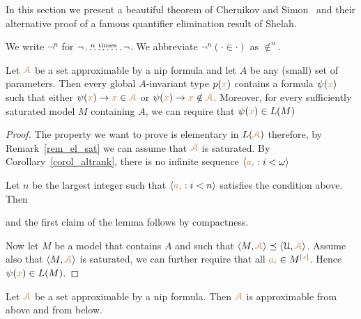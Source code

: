 \documentclass[creche.tex]{subfiles}
\begin{document}
In this section we present a beautiful theorem of Chernikov and Simon~\cite{CS} and their alternative proof of a famous quantifier elimination result of Shelah. 

We write \emph{$\neg^n$\/} for $\neg\!\stackrel{n\ \rm times}{\dots\dots\dots}\!\neg$. We abbreviate $\neg^n(\cdot\in\cdot)$ as \emph{$\notin^n$}.

\begin{lemma}\label{lem_honest}
Let ${\color{brown}{\EuScript A}}$ be a set approximable by a nip formula and let $A$ be any (small) set of parameters. Then every global $A$-invariant type $p({\color{brown} x})$ contains a formula $\psi({\color{brown} x})$ such that either $\psi({\color{brown} x})\rightarrow {\color{brown}x}\in{\color{brown}{\EuScript A}}$ or $\psi({\color{brown} x})\rightarrow {\color{brown}x}\notin{\color{brown}{\EuScript A}}$. Moreover, for every sufficiently saturated model $M$ containing $A$, we can require that $\psi({\color{brown} x})\in L(M)$
\end{lemma}

\begin{proof}
The property we want to prove is elementary in $L({\color{brown}{\EuScript A}})$ therefore, by Remark~\ref{rem_el_sat} we can assume that ${\color{brown}{\EuScript A}}$ is saturated. By Corollary~\ref{corol_altrank}, there is no infinite sequence $\langle{\color{brown}a_i}:i<\omega\rangle$


Let $n$ be the largest integer such that $\langle{\color{brown}a_i}:i<n\rangle$ satisfies the condition above. Then


and the first claim of the lemma follows by compactness. 

Now let $M$ be a model that contains $A$ and such that $\langle M,{\color{brown}{\EuScript A}}\rangle\preceq\langle\EuScript U,{\color{brown}{\EuScript A}}\rangle$. Assume also that $\langle M,{\color{brown}{\EuScript A}}\rangle$ is saturated, we can further require that all ${\color{brown} a_i}\in M^{|{\color{brown} x}|}$. Hence $\psi({\color{brown} x})\in L(M)$.
\end{proof}

\begin{theorem}\label{thm_honest}
Let ${\color{brown}{\EuScript A}}$ be a set approximable by a nip formula. Then ${\color{brown}{\EuScript A}}$ is approximable from above and from below.
\end{theorem}
\end{document}
